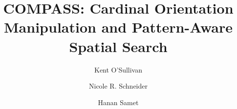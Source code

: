 \documentclass[sigconf]{style/acmart}
\begin{document}


\graphicspath{ {figures/}{auto_commit_fig/}{auto_fig/} }

\newcommand{\latexfile}[1]{}

\newcommand{\pinaforecomment}[4]{\colorbox{#1}{\textcolor{#4}{\parbox{.8\linewidth}{#2: #3}}}}
\newcommand{\osullikomment}[1]{\pinaforecomment{green}{Kent}{#1}{black}}
\newcommand{\nrscomment}[1]{\pinaforecomment{violet}{Nicole}{#1}{white}}

\newcommand\blankpage{%
    \null
    \thispagestyle{empty}%
    \addtocounter{page}{-1}%
    \newpage}

%



\title{COMPASS: Cardinal Orientation Manipulation and Pattern-Aware Spatial Search\\}

\author{Kent O'Sullivan}

\author{Nicole R. Schneider}
\authornotemark[1]

\author{Hanan Samet}



\begin{abstract}
\latexfile{00_Abstract.tex}
\end{abstract}

\maketitle
\end{document}
